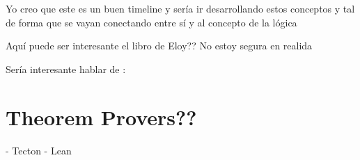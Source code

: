 \documentclass{article}
\begin{document}
Yo creo que este es un buen timeline y sería ir desarrollando estos conceptos y tal de forma que se vayan conectando entre sí y al concepto de la lógica



Aquí puede ser interesante el libro de Eloy?? No estoy segura en realida

Sería interesante hablar de :


\section{Theorem Provers??}
- Tecton
- Lean



\renewcommand{\refname}{Referencias}


\end{document}
